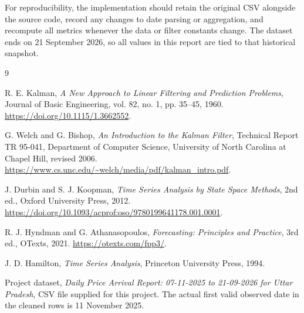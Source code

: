 \documentclass[12pt,a4paper,oneside]{report}
\numberwithin{equation}{chapter}
\numberwithin{figure}{chapter}
\numberwithin{table}{chapter}
\theoremstyle{definition}
\theoremstyle{plain}
\newcommand{\1}{\mathbf{1}}
\begin{document}
For reproducibility, the implementation should retain the original CSV alongside the source code, record any changes to date parsing or aggregation, and recompute all metrics whenever the data or filter constants change. The dataset ends on 21 September 2026, so all values in this report are tied to that historical snapshot.

\begin{thebibliography}{9}

R. E. Kalman,
\emph{A New Approach to Linear Filtering and Prediction Problems},
Journal of Basic Engineering, vol. 82, no. 1, pp. 35--45, 1960.
\url{https://doi.org/10.1115/1.3662552}.

G. Welch and G. Bishop,
\emph{An Introduction to the Kalman Filter},
Technical Report TR 95-041, Department of Computer Science, University of North Carolina at Chapel Hill, revised 2006.
\url{https://www.cs.unc.edu/~welch/media/pdf/kalman_intro.pdf}.

J. Durbin and S. J. Koopman,
\emph{Time Series Analysis by State Space Methods}, 2nd ed.,
Oxford University Press, 2012.
\url{https://doi.org/10.1093/acprof:oso/9780199641178.001.0001}.

R. J. Hyndman and G. Athanasopoulos,
\emph{Forecasting: Principles and Practice}, 3rd ed., OTexts, 2021.
\url{https://otexts.com/fpp3/}.

J. D. Hamilton,
\emph{Time Series Analysis}, Princeton University Press, 1994.

Project dataset,
\emph{Daily Price Arrival Report: 07-11-2025 to 21-09-2026 for Uttar Pradesh},
CSV file supplied for this project. The actual first valid observed date in the cleaned rows is 11 November 2025.

\end{thebibliography}
\end{document}
